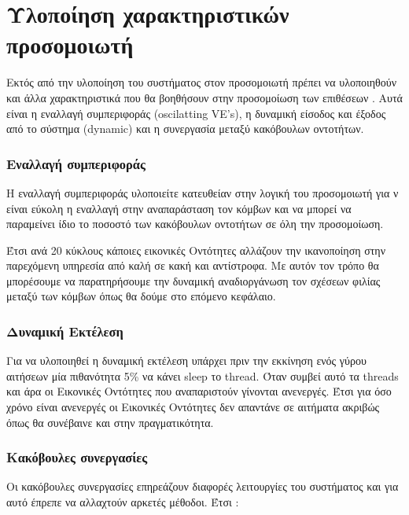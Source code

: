 \section{Υλοποίηση χαρακτηριστικών προσομοιωτή}
Εκτός από την υλοποίηση του συστήματος στον προσομοιωτή πρέπει να υλοποιηθούν και άλλα χαρακτηριστικά που θα βοηθήσουν στην προσομοίωση των επιθέσεων . Αυτά είναι η εναλλαγή συμπεριφοράς (oscilatting VE's), η δυναμική είσοδος και έξοδος από το σύστημα (dynamic) και η συνεργασία μεταξύ κακόβουλων οντοτήτων.

\subsubsection{Εναλλαγή συμπεριφοράς} 
Η εναλλαγή συμπεριφοράς υλοποιείτε κατευθείαν στην λογική του προσομοιωτή για ν είναι εύκολη η εναλλαγή στην αναπαράσταση τον κόμβων και να μπορεί να παραμείνει ίδιο το ποσοστό των κακόβουλων οντοτήτων σε όλη την προσομοίωση.

 Έτσι ανά 20 κύκλους κάποιες εικονικές Οντότητες αλλάζουν την ικανοποίηση στην παρεχόμενη υπηρεσία από καλή σε κακή και αντίστροφα. Με αυτόν τον τρόπο θα μπορέσουμε να παρατηρήσουμε την δυναμική αναδιοργάνωση τον σχέσεων φιλίας μεταξύ των κόμβων όπως θα δούμε στο επόμενο κεφάλαιο.
 
   
 \newpage  
 \subsubsection{Δυναμική Εκτέλεση}
 
 Για να υλοποιηθεί η δυναμική εκτέλεση υπάρχει πριν την εκκίνηση ενός γύρου αιτήσεων μία πιθανότητα 5\% να κάνει sleep το thread. Όταν συμβεί αυτό τα threads και άρα οι Εικονικές Οντότητες που αναπαριστούν γίνονται ανενεργές. Έτσι για όσο χρόνο είναι ανενεργές οι Εικονικές Οντότητες δεν απαντάνε σε αιτήματα ακριβώς όπως θα συνέβαινε και στην πραγματικότητα. 
 


 \subsubsection{Κακόβουλες συνεργασίες}
 
 Οι κακόβουλες συνεργασίες επηρεάζουν διαφορές λειτουργίες του συστήματος και για αυτό έπρεπε να αλλαχτούν αρκετές μέθοδοι. Έτσι :
 
